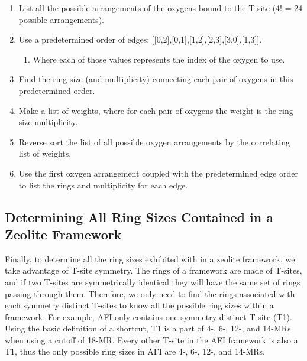 \documentclass[preprint,numrefs,noinfo,sort&compress]{elsarticle}
\providecommand{\DIFaddbegin}{} %
\providecommand{\DIFaddend}{} %
\providecommand{\DIFdelbegin}{} %
\providecommand{\DIFdelend}{} %
\newcommand{\DIFscaledelfig}{0.5}
\newlength{\DIFdelgraphicswidth} %
\newlength{\DIFdelgraphicsheight} %
\newcommand{\DIFaddincludegraphics}[2][]{{\color{blue}\fbox{\DIFOincludegraphics[#1]{#2}}}} %
\newcommand{\DIFdelincludegraphics}[2][]{%
\sbox{\DIFdelgraphicsbox}{\DIFOincludegraphics[#1]{#2}}%
\settoboxwidth{\DIFdelgraphicswidth}{\DIFdelgraphicsbox} %
\settoboxtotalheight{\DIFdelgraphicsheight}{\DIFdelgraphicsbox} %
\scalebox{\DIFscaledelfig}{%
\parbox[b]{\DIFdelgraphicswidth}{\usebox{\DIFdelgraphicsbox}\\[-\baselineskip] \rule{\DIFdelgraphicswidth}{0em}}\llap{\resizebox{\DIFdelgraphicswidth}{\DIFdelgraphicsheight}{%
\setlength{\unitlength}{\DIFdelgraphicswidth}%
\begin{picture}(1,1)%
\thicklines\linethickness{2pt} %
{\color[rgb]{1,0,0}\put(0,0){\framebox(1,1){}}}%
{\color[rgb]{1,0,0}\put(0,0){\line( 1,1){1}}}%
{\color[rgb]{1,0,0}\put(0,1){\line(1,-1){1}}}%
\end{picture}%
}\hspace*{3pt}}} %
} %
\DeclareRobustCommand{\DIFaddbegin}{\DIFOaddbegin \let\includegraphics\DIFaddincludegraphics} %
\DeclareRobustCommand{\DIFaddend}{\DIFOaddend \let\includegraphics\DIFOincludegraphics} %
\DeclareRobustCommand{\DIFdelbegin}{\DIFOdelbegin \let\includegraphics\DIFdelincludegraphics} %
\DeclareRobustCommand{\DIFdelend}{\DIFOaddend \let\includegraphics\DIFOincludegraphics} %
\begin{document}
\begin{enumerate}
\item List all the possible arrangements of the oxygens bound to the T-site (4! = 24 possible arrangements).
\item Use a predetermined order of edges: [[0,2],[0,1],[1,2],[2,3],[3,0],[1,3]].
\begin{enumerate}
\item Where each of those values represents the index of the oxygen to use.
\end{enumerate}
\item Find the ring size (and multiplicity) connecting each pair of oxygens in this predetermined order.
\item Make a list of weights, where for each pair of oxygens the weight is the ring size \texttimes{} multiplicity.
\item Reverse sort the list of all possible oxygen arrangements by the correlating list of weights.
\item Use the first oxygen arrangement coupled with the predetermined edge order to list the rings and multiplicity for each edge.
\end{enumerate}

\subsection{Determining All Ring Sizes Contained in a Zeolite Framework}
\DIFdelbegin %
\DIFdelend \DIFaddbegin \label{sec:org6a29aa7}
\DIFaddend 



Finally, to determine all the ring sizes exhibited with in a zeolite framework, we take advantage of T-site symmetry. The rings of a framework are made of T-sites, and if two T-sites are symmetrically identical they will have the same set of rings passing through them. Therefore, we only need to find the rings associated with each symmetry distinct T-sites to know all the possible ring sizes within a framework. For example, AFI only contains one symmetry distinct T-site (T1). Using the basic definition of a shortcut, T1 is a part of 4-, 6-, 12-, and 14-MRs when using a cutoff of 18-MR. Every other T-site in the AFI framework is also a T1, thus the only possible ring sizes in AFI are 4-, 6-, 12-, and 14-MRs.
\end{document}
